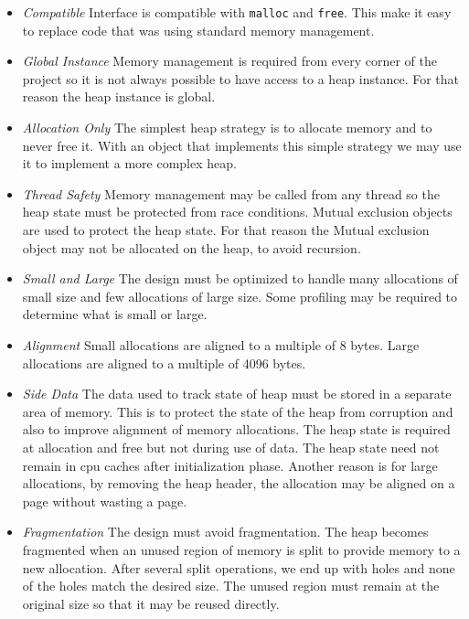 \begin{itemize}

\item \emph{Compatible} Interface is compatible with \verb|malloc| and
\verb|free|.  This make it easy to replace code that was using standard memory
management.

\item \emph{Global Instance} Memory management is required from every corner of
the project so it is not always possible to have access to a heap instance.
For that reason the heap instance is global.

\item \emph{Allocation Only} The simplest heap strategy is to allocate memory and to
never free it.  With an object that implements this simple strategy we may use
it to implement a more complex heap.

\item \emph{Thread Safety} Memory management may be called from any thread so
the heap state must be protected from race conditions.  Mutual exclusion
objects are used to protect the heap state.  For that reason the Mutual
exclusion object may not be allocated on the heap, to avoid recursion.

\item \emph{Small and Large} The design must be optimized to handle many
allocations of small size and few allocations of large size.  Some profiling
may be required to determine what is small or large.

\item \emph{Alignment} Small allocations are aligned to a multiple of 8 bytes.
Large allocations are aligned to a multiple of 4096 bytes.

\item \emph{Side Data} The data used to track state of heap must be stored in a
separate area of memory.  This is to protect the state of the heap from
corruption and also to improve alignment of memory allocations.  The heap state
is required at allocation and free but not during use of data.  The heap state
need not remain in cpu caches after initialization phase.  Another reason is
for large allocations, by removing the heap header, the allocation may be
aligned on a page without wasting a page.

\item \emph{Fragmentation} The design must avoid fragmentation.  The heap
becomes fragmented when an unused region of memory is split to provide memory
to a new allocation.  After several split operations, we end up with holes and
none of the holes match the desired size.  The unused region must remain at the
original size so that it may be reused directly.

\end{itemize}

